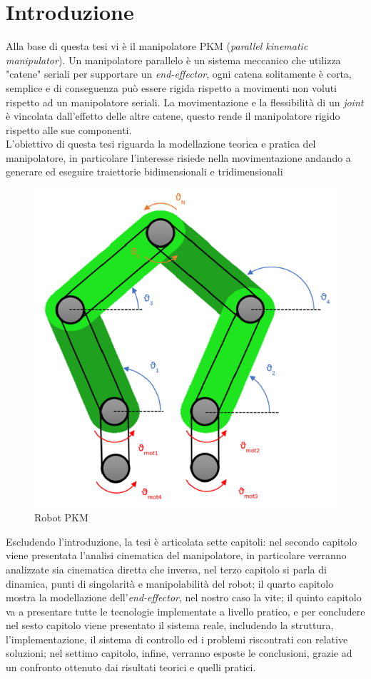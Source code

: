\section{Introduzione}
Alla base di questa tesi vi è il manipolatore PKM (\textit{parallel kinematic manipulator}). Un manipolatore parallelo è un sistema meccanico che utilizza "catene" seriali per supportare un \textit{end-effector}, ogni catena solitamente è corta, semplice e di conseguenza può essere rigida rispetto a movimenti non voluti rispetto ad un manipolatore seriali. La movimentazione e la flessibilità di un \textit{joint} è vincolata dall'effetto delle altre catene, questo rende il manipolatore rigido rispetto alle sue componenti.
\\L'obiettivo di questa tesi riguarda la modellazione teorica e pratica del manipolatore, in particolare l'interesse risiede nella movimentazione andando a generare ed eseguire traiettorie bidimensionali e tridimensionali
\begin{figure}[ht]
\begin{center}
    \includegraphics[scale=0.7]{Immagini/Robot1.png}
    \caption{Robot PKM}
\end{center}
\end{figure}
Escludendo l'introduzione, la tesi è articolata sette capitoli: nel secondo capitolo viene presentata l'analisi cinematica del manipolatore, in particolare verranno analizzate sia cinematica diretta che inversa, nel terzo capitolo si parla di dinamica, punti di singolarità e manipolabilità del robot; il quarto capitolo mostra la modellazione dell'\textit{end-effector}, nel nostro caso la vite; il quinto capitolo va a presentare tutte le tecnologie implementate a livello pratico, e per concludere nel sesto capitolo viene presentato il sistema reale, includendo la struttura, l'implementazione, il sistema di controllo ed i problemi riscontrati con relative soluzioni; nel settimo capitolo, infine, verranno esposte le conclusioni, grazie ad un confronto ottenuto dai risultati teorici e quelli pratici.
